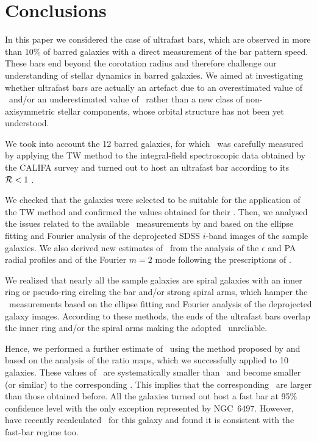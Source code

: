 \documentclass{aa}
\begin{document}
\section{Conclusions}
\label{sec:conclusions}

In this paper we considered the case of ultrafast bars, which are observed in more than 10\% of barred galaxies with a direct measurement of the bar pattern speed. These bars end beyond the corotation radius and therefore challenge our understanding of stellar dynamics in barred galaxies. We aimed at investigating whether ultrafast bars are actually an artefact due to an overestimated value of \rbar\ and/or an underestimated value of \rcor\ rather than a new class of non-axisymmetric stellar components, whose orbital structure has not been yet understood.

We took into account the 12 barred galaxies, for which \omegabar\ was carefully measured by applying the TW method to the integral-field spectroscopic data obtained by the CALIFA survey and turned out to host an ultrafast bar according to its ${\cal R}<1$ \citep{Aguerri2015, Cuomo2019b}.

We checked that the galaxies were selected to be suitable for the application of the TW method and confirmed the values obtained for their \rcor. Then, we analysed the issues related to the available \rbar\ measurements by \citet{Aguerri2015} and \citet{Cuomo2019b} based on the ellipse fitting and Fourier analysis of the deprojected SDSS $i$-band images of the sample galaxies. We also derived new estimates of \rbar\ from the analysis of the $\epsilon$ and PA radial profiles and of the Fourier $m=2$ mode following the prescriptions of \citet{Lee2019,Lee2020}.

We realized that nearly all the sample galaxies are spiral galaxies with an inner ring or pseudo-ring circling the bar and/or strong spiral arms, which hamper the \rbar\ measurements based on the ellipse fitting and Fourier analysis of the deprojected galaxy images. According to these methods, the ends of the ultrafast bars overlap the inner ring and/or the spiral arms making the adopted \rbar\ unreliable.

Hence, we performed a further estimate of \rbar\ using the method proposed by \citet{Lee2020} and based on the analysis of the ratio maps, which we successfully applied to 10 galaxies. These values of \rbar\ are systematically smaller than \rmean\ and become smaller (or similar) to the corresponding \rcor. This implies that the corresponding \rr\ are larger than those obtained before. All the galaxies turned out host a fast bar at 95\% confidence level with the only exception represented by NGC~6497. However, \citet{Garma-Oehmichen2020} have recently recalculated \rcor\ for this galaxy and found it is consistent with the fast-bar regime too.
\end{document}
